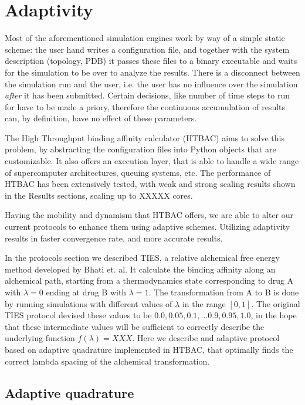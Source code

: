\section{Adaptivity}

Most of the aforementioned simulation engines work by way of a simple static scheme: the user hand writes a configuration file, and together with the system description (topology, PDB) it passes these files to a binary executable and waits for the simulation to be over to analyze the results. There is a disconnect between the simulation run and the user, i.e. the user has no influence over the simulation \emph{after} it has been submitted. Certain decisions, like number of time steps to run for have to be made a priory, therefore the continuous accumulation of results can, by definition, have no effect of these parameters.

The High Throughput binding affinity calculator (HTBAC) aims to solve this problem, by abstracting the configuration files into Python objects that are customizable. It also offers an execution layer, that is able to handle a wide range of supercomputer architectures, queuing systems, etc. The performance of HTBAC has been extensively tested, with weak and strong scaling results shown in the Results sections, scaling up to XXXXX cores. 

Having the mobility and dynamism that HTBAC offers, we are able to alter our current protocols to enhance them using adaptive schemes. Utilizing adaptivity results in faster convergence rate, and more accurate results.

In the protocols section we described TIES, a relative alchemical free energy method developed by Bhati et. al. It calculate the binding affinity along an alchemical path, starting from a thermodynamics state corresponding to drug A with $\lambda=0$ ending at drug B with $\lambda=1$. The transformation from A to B is done by running simulations with different values of $\lambda$ in  the range $[0, 1]$. The original TIES protocol devised these values to be $0.0, 0.05, 0.1, ... 0.9, 0.95, 1.0$, in the hope that these intermediate values will be sufficient to correctly describe the underlying function $f(\lambda)=XXX$. Here we describe and adaptive protocol based on adaptive quadrature implemented in HTBAC, that optimally finds the correct lambda spacing of the alchemical transformation.

\subsection{Adaptive quadrature}

